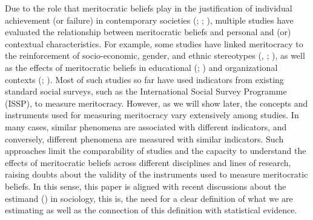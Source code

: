 \documentclass[
  10pt,
  a4paper,
]{article}
\begin{document}
Due to the role that meritocratic beliefs play in the justification of individual achievement (or failure) in contemporary societies (; ; ), multiple studies have evaluated the relationship between meritocratic beliefs and personal and (or) contextual characteristics. For example, some studies have linked meritocracy to the reinforcement of socio-economic, gender, and ethnic stereotypes (, ; ), as well as the effects of meritocratic beliefs in educational (; ) and organizational contexts (; ). Most of such studies so far have used indicators from existing standard social surveys, such as the International Social Survey Programme (ISSP), to measure meritocracy. However, as we will show later, the concepts and instruments used for measuring meritocracy vary extensively among studies. In many cases, similar phenomena are associated with different indicators, and conversely, different phenomena are measured with similar indicators. Such approaches limit the comparability of studies and the capacity to understand the effects of meritocratic beliefs across different disciplines and lines of research, raising doubts about the validity of the instruments used to measure meritocratic beliefs. In this sense, this paper is aligned with recent discussions about the estimand () in sociology, this is, the need for a clear definition of what we are estimating as well as the connection of this definition with statistical evidence.
\end{document}
